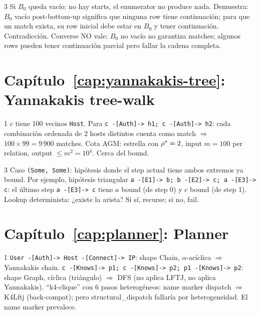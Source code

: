 \begin{solucion}{3}
Si \(B_0\) queda vacío: no hay starts, el enumerator no produce
nada. Demuestra: \(B_0\) vacío post-bottom-up significa que ninguna
row tiene continuación; para que un match exista, su row inicial
debe estar en \(B_0\) y tener continuación. Contradicción.
Converse NO vale: \(B_0\) no vacío no garantiza matches; algunos
rows pueden tener continuación parcial pero fallar la cadena
completa.
\end{solucion}

\section*{Capítulo~\ref{cap:yannakakis-tree}: Yannakakis tree-walk}

\begin{solucion}{1}
\(c\) tiene 100 vecinos \texttt{Host}. Para
\texttt{c -[Auth]-> h1; c -[Auth]-> h2}: cada combinación
ordenada de 2 hosts distintos cuenta como match
$\Rightarrow$ \(100 \times 99 = 9\,900\) matches. Cota AGM:
estrella con \(\rho^{*} = 2\), input \(m = 100\) per relation,
output \(\leq m^2 = 10^4\). Cerca del bound.
\end{solucion}

\begin{solucion}{3}
Caso \texttt{(Some, Some)}: hipótesis donde el step actual tiene
ambos extremos ya bound. Por ejemplo, hipótesis triangular
\texttt{a -[E1]-> b; b -[E2]-> c; a -[E3]-> c}: el último step
\texttt{a -[E3]-> c} tiene \(a\) bound (de step 0) y \(c\) bound
(de step 1). Lookup determinista: ¿existe la arista? Si sí,
recurse; si no, fail.
\end{solucion}

\section*{Capítulo~\ref{cap:planner}: Planner}

\begin{solucion}{1}
\texttt{User -[Auth]-> Host -[Connect]-> IP}: shape Chain,
\(\alpha\)-acíclica $\Rightarrow$ Yannakakis chain.
\texttt{c -[Knows]-> p1; c -[Knows]-> p2; p1 -[Knows]-> p2}:
shape Graph, cíclica (triángulo) $\Rightarrow$ DFS (no aplica
LFTJ, no aplica Yannakakis).
``k4-clique'' con 6 pasos heterogéneos: name marker dispatch
$\Rightarrow$ K4Lftj (back-compat); pero structural\_dispatch
fallaría por heterogeneidad. El name marker prevalece.
\end{solucion}

